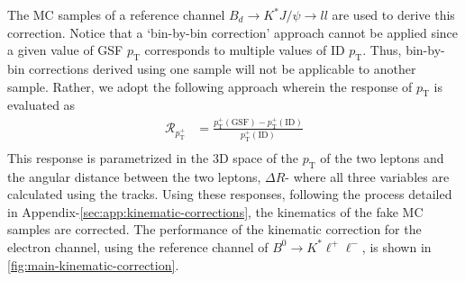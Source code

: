 %
The MC samples of a reference channel $B_d\rightarrow K^\ast J/\psi \rightarrow ll$ are used to derive this correction. %
Notice that a `bin-by-bin correction' approach cannot be applied since a given value of GSF $p_{\text{T}}$ corresponds to multiple values of ID $p_{\text{T}}$. %
Thus, bin-by-bin corrections derived using one sample will not be applicable to another sample. %
Rather, we adopt the following approach wherein the response of $p_{\text{T}}$ is evaluated as
    \begin{align}
        \mathcal{R}_{p^+_{\text{T}}} &= \frac{p^+_{\text{T}}({\text{GSF}}) - p^+_{\text{T}}({\text{ID}})}{p^+_{\text{T}}({\text{ID}})}\\
    \end{align}
This response is parametrized in the $3{\text{D}}$ space of the $p_{\text{T}}$ of the two leptons and the angular distance between the two leptons, $\Delta R$- where all three variables are calculated using the {} tracks. Using these responses, following the process detailed in Appendix-\ref{sec:app:kinematic-corrections}, the kinematics of the fake MC samples are corrected. %
The performance of the kinematic correction for the electron channel, using the reference channel of $B^0 \to K^\ast \ell^+ \ell^-$, is shown in \ref{fig:main-kinematic-correction}. %
